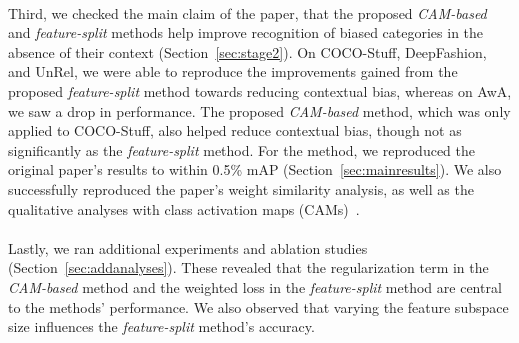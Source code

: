 \\
Third, we checked the main claim of the paper, that the proposed \emph{CAM-based} and \emph{feature-split} methods help improve recognition of biased categories in the absence of their context (Section~\ref{sec:stage2}). On COCO-Stuff, DeepFashion, and UnRel, we were able to reproduce the improvements gained from the proposed \textit{feature-split} method towards reducing contextual bias, whereas on AwA, we saw a drop in performance. The proposed \textit{CAM-based} method, which was only applied to COCO-Stuff, also helped reduce contextual bias, though not as significantly as the \textit{feature-split} method. For the  method, we reproduced the original paper's results to within 0.5\% mAP (Section~\ref{sec:mainresults}). We also successfully reproduced the paper's weight similarity analysis, as well as the qualitative analyses with class activation maps (CAMs)~\cite{zhou2015cnnlocalization}.\\
\\
Lastly, we ran additional experiments and ablation studies (Section~\ref{sec:addanalyses}). These revealed that the regularization term in the \emph{CAM-based} method and the weighted loss in the \emph{feature-split} method are central to the methods' performance. We also observed that varying the feature subspace size influences the \emph{feature-split} method's accuracy.
